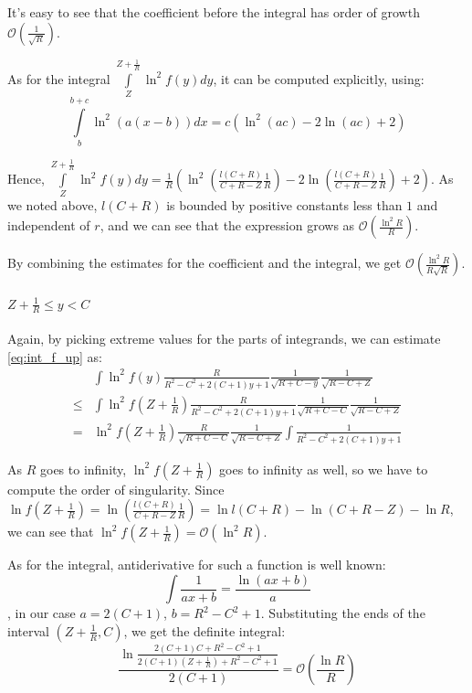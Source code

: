 \documentclass{gCOV2e}
\theoremstyle{plain}%
\theoremstyle{definition}
\theoremstyle{remark}
\begin{document}
It's easy to see that the coefficient before the integral has order of growth $\mathcal{O}\left(\frac{1}{\sqrt{R}}\right)$.

As for the integral $\int\limits_{Z}^{Z + \frac{1}{R}} \ln^2 f(y) dy$, it can be computed explicitly, using:
\[
    \int\limits_b^{b + c} \ln^2 (a (x - b)) dx = c (\ln^2(a c) - 2 \ln (a c) + 2)
\]

Hence, $\int\limits_{Z}^{Z + \frac{1}{R}} \ln^2 f(y) dy = \frac{1}{R} ( \ln^2 (\frac{l(C + R)}{C + R - Z} \frac{1}{R}) - 2 \ln (\frac{l(C + R)}{C + R - Z} \frac{1}{R}) + 2)$. As we noted above, $l(C + R)$ is bounded by positive constants less than $1$ and independent of $r$, and we can see that the expression grows as $\mathcal{O}(\frac{\ln^2 R}{R})$.

By combining the estimates for the coefficient and the integral, we get $\mathcal{O}(\frac{\ln^2 R}{R \sqrt{R}})$.

\paragraph{$Z + \frac{1}{R} \le y < C$}
Again, by picking extreme values for the parts of integrands, we can estimate \ref{eq:int_f_up} as:
\begin{align*}
       & \int \ln^2 f(y) \frac{R}{R^2 - C^2 + 2 (C + 1) y + 1} \frac{1}{\sqrt{R + C - y}} \frac{1}{\sqrt{R - C + Z}}
\\ \le & \int \ln^2 f(Z + \frac{1}{R}) \frac{R}{R^2 - C^2 + 2 (C + 1) y + 1} \frac{1}{\sqrt{R + C - C}} \frac{1}{\sqrt{R - C + Z}}
\\  =  & \ln^2 f(Z + \frac{1}{R})  \frac{R}{\sqrt{R + C - C}} \frac{1}{\sqrt{R - C + Z}} \int \frac{1}{R^2 - C^2 + 2 (C + 1) y + 1}
\end{align*}

As $R$ goes to infinity, $\ln^2 f(Z + \frac{1}{R})$ goes to infinity as well, so we have to compute the order of singularity. Since $\ln f(Z + \frac{1}{R}) = \ln \left( \frac{l(C + R)}{C + R - Z} \frac{1}{R} \right) = \ln l(C + R) - \ln (C + R - Z) - \ln R$, we can see that $\ln^2 f(Z + \frac{1}{R}) = \mathcal{O} (\ln^2 R)$.


As for the integral, antiderivative for such a function is well known:
\[
\int \frac{1}{a x + b} = \frac{\ln (a x + b)}{a}
\]
, in our case $a = 2 (C + 1)$, $b = R^2 - C^2 + 1$. Substituting the ends of the interval $(Z + \frac{1}{R}, C)$, we get the definite integral:
\[
\frac{\ln \frac{2 (C + 1) C + R^2 - C^2 + 1}{2 (C + 1) (Z + \frac{1}{R}) + R^2 - C^2 + 1}}{2 (C + 1)} = \mathcal{O}\left( \frac{\ln R}{R} \right)
\]
\end{document}

